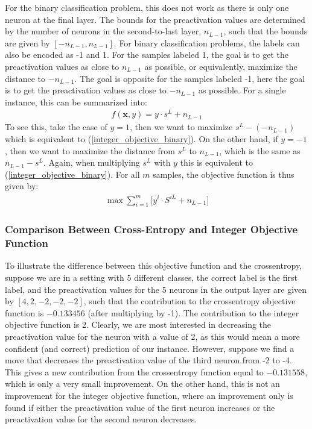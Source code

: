 \noindent For the binary classification problem, this does not work as there is only one neuron at the final layer. The bounds for the preactivation values are determined by the number of neurons in the second-to-last layer, $n_{L-1}$, such that the bounds are given by $[-n_{L-1}, n_{L-1}]$. For binary classification problems, the labels can also be encoded as -1 and 1. For the samples labeled 1, the goal is to get the preactivation values as close to $n_{L-1}$ as possible, or equivalently, maximize the distance to $-n_{L-1}$. The goal is opposite for the samples labeled -1, here the goal is to get the preactivation values as close to $-n_{L-1}$ as possible. For a single instance, this can be summarized into:
\begin{align}
    \label{integer_objective_binary} f(\mathbf{x}, y) = y\cdot s^L + n_{L-1}
\end{align}
To see this, take the case of $y=1$, then we want to maximize $s^L - (-n_{L-1})$ which is equivalent to (\ref{integer_objective_binary}). On the other hand, if $y = -1$, then we want to maximize the distance from $s^L$ to $n_{L-1}$, which is the same as $n_{L-1} - s^L$. Again, when multiplying $s^L$ with $y$ this is equivalent to (\ref{integer_objective_binary}). For all $m$ samples, the objective function is thus given by:
\begin{align}
    \label{int_binary} \max \sum_{i=1} ^m \big[ y^i \cdot S^{iL} + n_{L-1} \big]
\end{align}

\subsubsection{Comparison Between Cross-Entropy and Integer Objective Function}
To illustrate the difference between this objective function and the crossentropy, suppose we are in a setting with 5 different classes, the correct label is the first label, and the preactivation values for the 5 neurons in the output layer are given by $[4, 2, -2, -2, -2]$, such that the contribution to the crossentropy objective function is $-0.133456$ (after multiplying by -1). The contribution to the integer objective function is 2. Clearly, we are most interested in decreasing the preactivation value for the neuron with a value of 2, as this would mean a more confident (and correct) prediction of our instance. However, suppose we find a move that decreases the preactivation value of the third neuron from -2 to -4. This gives a new contribution from the crossentropy function equal to $-0.131558$, which is only a very small improvement. On the other hand, this is not an improvement for the integer objective function, where an improvement only is found if either the preactivation value of the first neuron increases or the preactivation value for the second neuron decreases. 

